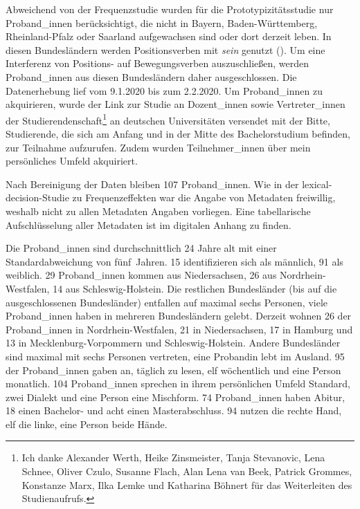 \begin{sloppypar}
Abweichend von der Frequenzstudie wurden für die Prototypizitätsstudie nur Proband\_in\-nen berücksichtigt, die nicht in Bayern, Baden-Württemberg, Rhein\-land-Pfalz oder Saarland aufgewachsen sind oder dort derzeit leben. In diesen Bundesländern werden Positionsverben mit \textit{sein} genutzt (\cite{VariantengrammatikdesStandarddeutschen.2018}). Um eine Interferenz von Positions- auf Bewegungsverben auszuschließen, werden Proband\_innen aus diesen Bundesländern daher ausgeschlossen. Die Datenerhebung lief vom 9.1.2020 bis zum 2.2.2020. Um Proband\_innen zu akquirieren, wurde der Link zur Studie an Dozent\_innen sowie Vertreter\_innen der Studierendenschaft\footnote{Ich danke Alexander Werth, Heike Zinsmeister, Tanja Stevanovic, Lena Schnee, Oliver Czulo, Susanne Flach, Alan Lena van Beek, Patrick Grommes, Konstanze Marx, Ilka Lemke und Katharina Böhnert für das Weiterleiten des Studienaufrufs.} an deutschen Universitäten versendet mit der Bitte, Studierende, die sich am Anfang und in der Mitte des Bachelorstudium befinden, zur Teilnahme aufzurufen. Zudem wurden Teilnehmer\_innen über mein persönliches Umfeld akquiriert.
\end{sloppypar}

Nach Bereinigung der Daten bleiben 107 Proband\_innen. Wie in der lexical-decision-Studie zu Frequenzeffekten war die Angabe von Metadaten freiwillig, weshalb nicht zu allen Metadaten Angaben vorliegen. Eine tabellarische Aufschlüsselung aller Metadaten ist im digitalen Anhang zu finden.  

\begin{sloppypar}
Die Proband\_innen sind durchschnittlich 24 Jahre alt mit einer Standardabweichung von fünf~Jahren. 15 identifizieren sich als männlich, 91 als weiblich. 29 Proband\_innen kommen aus Niedersachsen, 26 aus Nordrhein-Westfalen, 14 aus Schleswig-Holstein. Die restlichen Bundesländer (bis auf die ausgeschlossenen Bundesländer) entfallen auf maximal sechs Personen, viele Proband\_innen haben in mehreren Bundesländern gelebt. Derzeit wohnen 26 der Pro\-\mbox{band\_in}\-nen in Nordrhein-Westfalen, 21 in Niedersachsen, 17 in Hamburg und 13 in Mecklenburg-Vorpommern und Schleswig-Holstein. Andere Bundesländer sind maximal mit sechs Personen vertreten, eine Probandin lebt im Ausland. 95 der Proband\_innen gaben an, täglich zu lesen, elf wöchentlich und eine Person monatlich. 104 Proband\_innen sprechen in ihrem persönlichen Umfeld Standard, zwei Dialekt und eine Person eine Mischform. 74 Proband\_innen haben Abitur, 18 einen Bachelor- und acht einen Masterabschluss. 94 nutzen die rechte Hand, elf die linke, eine Person beide Hände.
\end{sloppypar}

